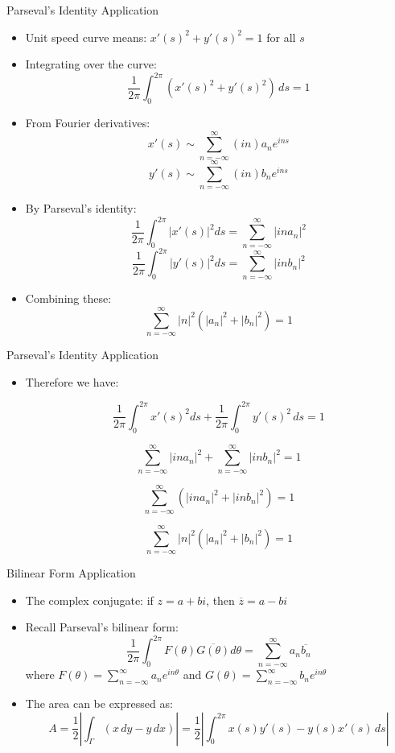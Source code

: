 \documentclass{beamer}
\begin{document}
\begin{frame}{Parseval's Identity Application}
    \begin{itemize}
        \item Unit speed curve means: $x'(s)^2 + y'(s)^2 = 1$ for all $s$
        \item Integrating over the curve:
        $$\frac{1}{2\pi}\int_0^{2\pi} (x'(s)^2 + y'(s)^2) \, ds = 1$$
        \item From Fourier derivatives:
        $$x'(s) \sim \sum_{n=-\infty}^{\infty} (in)a_n e^{ins}$$
        $$y'(s) \sim \sum_{n=-\infty}^{\infty} (in)b_n e^{ins}$$
        \item By Parseval's identity:
        $$\frac{1}{2\pi}\int_0^{2\pi} |x'(s)|^2 ds = \sum_{n=-\infty}^{\infty} |ina_n|^2$$
        $$\frac{1}{2\pi}\int_0^{2\pi} |y'(s)|^2 ds = \sum_{n=-\infty}^{\infty} |inb_n|^2$$
        \item Combining these:
        $$\sum_{n=-\infty}^{\infty} |n|^2 (|a_n|^2 + |b_n|^2) = 1$$
    \end{itemize}
\end{frame}

\begin{frame}{Parseval's Identity Application}
    \begin{itemize}
        \item Therefore we have:

        $$\frac{1}{2\pi}\int_0^{2\pi} x'(s)^2 ds + \frac{1}{2\pi}\int_0^{2\pi} y'(s)^2 \, ds = 1$$

        $$ \sum_{n=-\infty}^{\infty} |ina_n|^2 + \sum_{n=-\infty}^{\infty} |inb_n|^2 = 1$$

        $$\sum_{n=-\infty}^{\infty} (|ina_n|^2 + |inb_n|^2) = 1$$
        
        $$\sum_{n=-\infty}^{\infty} |n|^2 (|a_n|^2 + |b_n|^2) = 1$$
        
    \end{itemize}
\end{frame}

   
\begin{frame}{Bilinear Form Application}
   \begin{itemize}
   \item The complex conjugate: if $z=a+bi$, then $\overline{z} = a-bi$
   \item Recall Parseval's bilinear form:
       \begin{equation}
       \frac{1}{2\pi} \int_{0}^{2\pi} F(\theta) \overline{G(\theta)} d\theta = \sum_{n=-\infty}^{\infty} a_n \overline{b_n}
       \end{equation}
       where $F(\theta) = \sum_{n=-\infty}^{\infty} a_n e^{in\theta}$ and $G(\theta) = \sum_{n=-\infty}^{\infty} b_n e^{in\theta}$
       
   \item The area can be expressed as:
       $$A = \frac{1}{2} \left| \int_{\Gamma} (x \, dy - y \, dx) \right| = \frac{1}{2} \left| \int_{0}^{2\pi} x(s)y'(s) - y(s)x'(s) \, ds \right|$$
   
  
   \end{itemize}
\end{frame}
\end{document}
